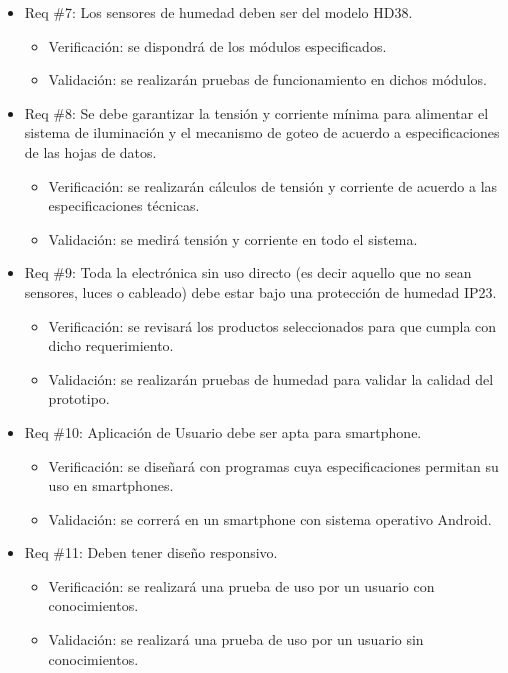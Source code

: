 \documentclass[
11pt, %
]{charter}
\begin{document}
\begin{itemize}
\item Req \#7: Los sensores de humedad deben ser del modelo HD38.
\begin{itemize}
	\item Verificación: se dispondrá de los módulos especificados.
	\item Validación: se realizarán pruebas de funcionamiento en dichos módulos.
\end{itemize}

\item Req \#8: Se debe garantizar la tensión y corriente mínima para alimentar el sistema de iluminación y el mecanismo de goteo de acuerdo a especificaciones de las hojas de datos.
\begin{itemize}
	\item Verificación: se realizarán cálculos de tensión y corriente de acuerdo a las especificaciones técnicas.
	\item Validación: se medirá tensión y corriente en todo el sistema.
\end{itemize}

\item Req \#9: Toda la electrónica sin uso directo (es decir aquello que no sean sensores, luces o cableado) debe estar bajo una protección de humedad IP23.
\begin{itemize}
	\item Verificación: se revisará los productos seleccionados para que cumpla con dicho requerimiento.
	\item Validación: se realizarán pruebas de humedad para validar la calidad del prototipo.
\end{itemize}

\item Req \#10: Aplicación de Usuario debe ser apta para smartphone.
\begin{itemize}
	\item Verificación: se diseñará con programas cuya especificaciones permitan su uso en smartphones.
	\item Validación: se correrá en un smartphone con sistema operativo Android.
\end{itemize}

\item Req \#11: Deben tener diseño responsivo.
\begin{itemize}
	\item Verificación: se realizará una prueba de uso por un usuario con conocimientos.
	\item Validación: se realizará una prueba de uso por un usuario sin conocimientos.
\end{itemize}


\end{itemize}
\end{document}
